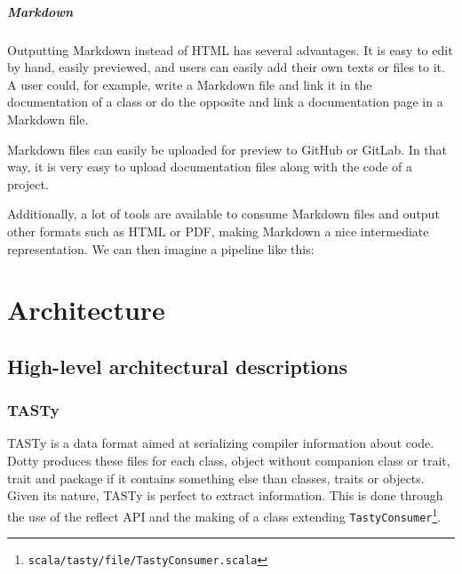 \documentclass{report}
\begin{document}
\paragraph{Markdown}
Outputting Markdown instead of HTML has several advantages. It is easy to edit by hand, easily previewed, and users can easily add their own texts or files to it. A user could, for example, write a Markdown file and link it in the documentation of a class or do the opposite and link a documentation page in a Markdown file.

Markdown files can easily be uploaded for preview to GitHub or GitLab. In that way, it is very easy to upload documentation files along with the code of a project.

Additionally, a lot of tools are available to consume Markdown files and output other formats such as HTML or PDF, making Markdown a nice intermediate representation. We can then imagine a pipeline like this:
\begin{center}
\end{center}

\chapter{Architecture}
\section{High-level architectural descriptions}
\subsection{TASTy}
TASTy is a data format aimed at serializing compiler information about code. Dotty produces these files for each class, object without companion class or trait, trait and package if it contains something else than classes, traits or objects. Given its nature, TASTy is perfect to extract information.
This is done through the use of the reflect API and the making of a class extending \texttt{TastyConsumer}\footnote{\texttt{scala/tasty/file/TastyConsumer.scala}}.
\end{document}
